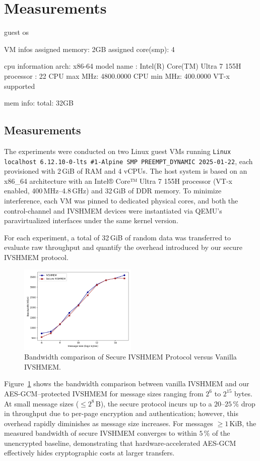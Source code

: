 \documentclass[conference]{IEEEtran}
\begin{document}
\section{Measurements}

guest os

VM infos assigned memory: 2GB assigned core(smp): 4

cpu information arch: x86-64 model name : Intel(R) Core(TM) Ultra 7 155H
processor : 22 CPU max MHz: 4800.0000 CPU min MHz: 400.0000 VT-x supported

mem info: total: 32GB

\subsection{Measurements}

The experiments were conducted on two Linux guest VMs running \texttt{Linux
  localhost 6.12.10-0-lts \#1-Alpine SMP PREEMPT\_DYNAMIC 2025-01-22}, each
provisioned with 2\,GiB of RAM and 4 vCPUs. The host system is based on an
x86\_64 architecture with an Intel® Core™ Ultra 7 155H processor (VT-x enabled,
400\,MHz–4.8\,GHz) and 32\,GiB of DDR memory. To minimize interference, each VM
was pinned to dedicated physical cores, and both the control-channel and
IVSHMEM devices were instantiated via QEMU’s paravirtualized interfaces under
the same kernel version.

For each experiment, a total of 32\,GiB of random data was transferred to
evaluate raw throughput and quantify the overhead introduced by our secure
IVSHMEM protocol.

\begin{figure}[!h]
  \centering
  \includegraphics[width=0.5\textwidth]{figures/shm_basic.png}
  \caption{Bandwidth comparison of Secure IVSHMEM Protocol versus Vanilla IVSHMEM.}
  \label{fig:perf_bandwidth_overhead}
\end{figure}

Figure~\ref{fig:perf_bandwidth_overhead} shows the bandwidth comparison between
vanilla IVSHMEM and our AES-GCM–protected IVSHMEM for message sizes ranging
from $2^6$ to $2^{15}$ bytes. At small message sizes ($\leq 2^8\,$B), the
secure protocol incurs up to a $20$--$25\,\%$ drop in throughput due to
per-page encryption and authentication; however, this overhead rapidly
diminishes as message size increases. For messages $\geq 1\,$KiB, the measured
bandwidth of secure IVSHMEM converges to within $5\,\%$ of the unencrypted
baseline, demonstrating that hardware-accelerated AES-GCM effectively hides
cryptographic costs at larger transfers.
\end{document}
